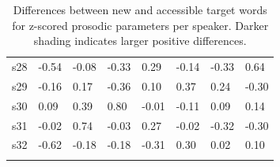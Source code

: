 \begin{table}[]
\begin{tabular}{llllllll}
s28 & -0.54                                                         & -0.08                                                        & -0.33                                                                   & \cellcolor[HTML]{C0C0C0}0.29 & -0.14                                                            & -0.33                                                                & \cellcolor[HTML]{9B9B9B}0.64                                               \\
s29 & -0.16                                                         & \cellcolor[HTML]{C0C0C0}0.17                                 & -0.36                                                                   & \cellcolor[HTML]{C0C0C0}0.10 & \cellcolor[HTML]{C0C0C0}0.37                                     & \cellcolor[HTML]{C0C0C0}0.24                                         & -0.30                                                                      \\
s30 & \cellcolor[HTML]{EFEFEF}0.09                                  & \cellcolor[HTML]{C0C0C0}0.39                                 & \cellcolor[HTML]{9B9B9B}0.80                                            & -0.01                        & -0.11                                                            & \cellcolor[HTML]{EFEFEF}0.09                                         & \cellcolor[HTML]{C0C0C0}0.14                                               \\
s31 & -0.02                                                         & \cellcolor[HTML]{9B9B9B}0.74                                 & -0.03                                                                   & \cellcolor[HTML]{C0C0C0}0.27 & -0.02                                                            & -0.32                                                                & -0.30                                                                      \\
s32 & -0.62                                                         & -0.18                                                        & -0.18                                                                   & -0.31                        & \cellcolor[HTML]{C0C0C0}0.30                                     & \cellcolor[HTML]{EFEFEF}0.02                                         & \cellcolor[HTML]{C0C0C0}0.10                                               \\
\lspbottomrule
\end{tabular}
\caption{Differences between new and accessible target words for z-scored prosodic parameters per speaker. Darker shading indicates larger positive differences.}
\label{table:zscore_diffs}
\end{table}

